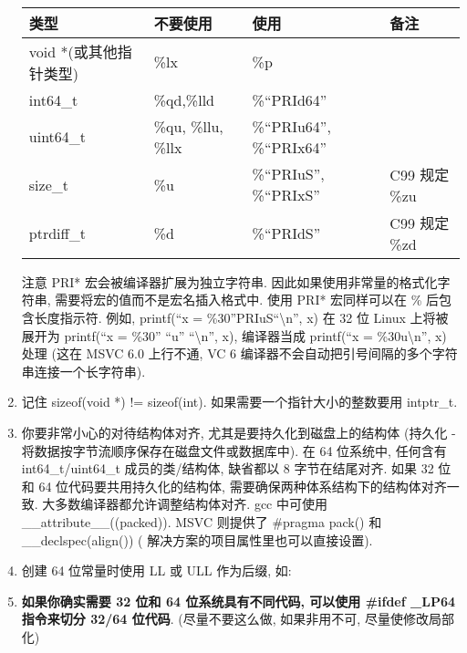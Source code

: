 \documentclass[a4paper,11pt,CJK]{article}
\begin{document}
\begin{CJK}{UTF8}{gbsn}
\begin{enumerate}
{}
\\
\\
\\
\begin{table}[htbp]
\flushright
\begin{tabular}{llll}
\toprule
类型 & 不要使用 & 使用 & 备注\\
\midrule
\small{void *(或其他指针类型)}&\small{\%lx}&\small{\%p}&\\
\small{int64\_t}&\small{\%qd,\%lld}&\small{\%``PRId64''}&\\
\small{uint64\_t}&\small{\%qu, \%llu, \%llx}&\small{\%``PRIu64'', \%``PRIx64''}&\\
\small{size\_t}&\small{\%u}&\small{\%``PRIuS'', \%``PRIxS''}&\small{C99 规定 \%zu}\\
\small{ptrdiff\_t}&\small{\%d}&\small{\%``PRIdS''}&\small{C99 规定 \%zd}\\
\bottomrule
\end{tabular}
\end{table}
注意 PRI* 宏会被编译器扩展为独立字符串. 因此如果使用非常量的格式化字符串, 需要将宏的值而不是宏名插入格式中. 使用 PRI* 宏同样可以在 \% 后包含长度指示符. 例如, printf(``x = \%30''PRIuS``\textbackslash n'', x) 在 32 位 Linux 上将被展开为 printf(``x = \%30'' ``u'' ``\textbackslash n'', x), 编译器当成 printf(``x = \%30u\textbackslash n'', x) 处理 (这在 MSVC 6.0 上行不通, VC 6 编译器不会自动把引号间隔的多个字符串连接一个长字符串).
\item
记住 sizeof(void *) != sizeof(int). 如果需要一个指针大小的整数要用 intptr\_t.
\item
你要非常小心的对待结构体对齐, 尤其是要持久化到磁盘上的结构体 (持久化 - 将数据按字节流顺序保存在磁盘文件或数据库中). 在 64 位系统中, 任何含有 int64\_t/uint64\_t 成员的类/结构体, 缺省都以 8 字节在结尾对齐. 如果 32 位和 64 位代码要共用持久化的结构体, 需要确保两种体系结构下的结构体对齐一致. 大多数编译器都允许调整结构体对齐. gcc 中可使用 \_\_attribute\_\_((packed)). MSVC 则提供了 \#pragma pack() 和 \_\_declspec(align()) ( 解决方案的项目属性里也可以直接设置).
\item
创建 64 位常量时使用 LL 或 ULL 作为后缀, 如:\\
\item
\textbf{如果你确实需要 32 位和 64 位系统具有不同代码, 可以使用 \#ifdef \_LP64 指令来切分 32/64 位代码}. (尽量不要这么做, 如果非用不可, 尽量使修改局部化)
\end{enumerate}


\end{CJK}
\end{document}
